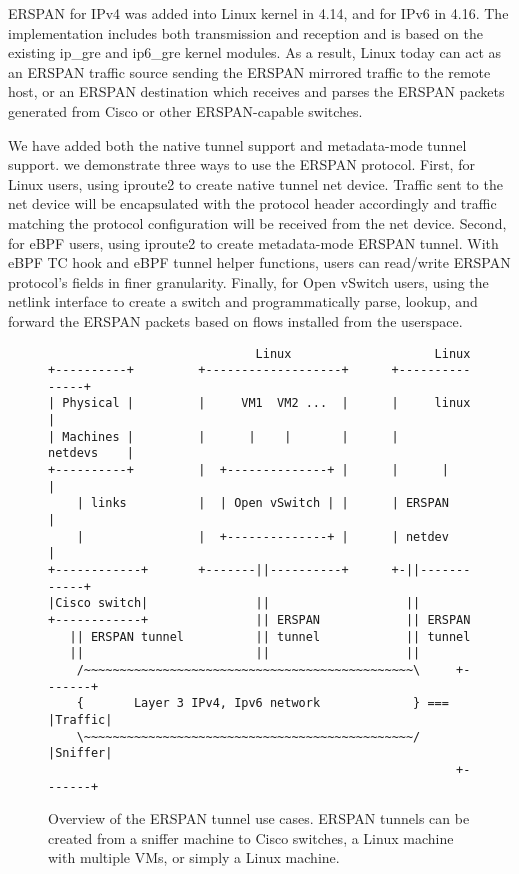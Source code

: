 \documentclass[10pt]{sigplanconf}
\begin{document}
ERSPAN for IPv4 was added into Linux kernel in 4.14, and for IPv6 in 4.16.
The implementation includes both transmission and reception and is based on the
existing ip\_gre and ip6\_gre kernel modules.  As a result, Linux today can act as
an ERSPAN traffic source sending the ERSPAN mirrored traffic to the remote host,
or an ERSPAN destination which receives and parses the ERSPAN packets generated
from Cisco or other ERSPAN-capable switches.
  
We have added both the native tunnel support and metadata-mode tunnel support.
we demonstrate three ways to use the ERSPAN protocol.
First, for Linux users, using iproute2 to create native tunnel net device.
Traffic sent to the net device will be encapsulated with the protocol header
accordingly and traffic matching the protocol configuration will be received
from the net device.  Second, for eBPF users, using iproute2 to create metadata-mode
ERSPAN tunnel.  With eBPF TC hook and eBPF tunnel helper functions, users can
read/write ERSPAN protocol’s fields in finer granularity.
Finally, for Open vSwitch users, using the netlink interface to create a switch
and programmatically parse, lookup, and forward the ERSPAN packets based on flows
installed from the userspace.

\begin{figure}
{\scriptsize
\begin{verbatim}
                             Linux                    Linux
+----------+         +-------------------+      +---------------+
| Physical |         |     VM1  VM2 ...  |      |     linux     |
| Machines |         |      |    |       |      |    netdevs    |
+----------+         |  +--------------+ |      |      |        |
    | links          |  | Open vSwitch | |      | ERSPAN        |
    |                |  +--------------+ |      | netdev        |
+------------+       +-------||----------+      +-||------------+ 
|Cisco switch|               ||                   ||
+------------+               || ERSPAN            || ERSPAN
   || ERSPAN tunnel          || tunnel            || tunnel
   ||                        ||                   ||
    /~~~~~~~~~~~~~~~~~~~~~~~~~~~~~~~~~~~~~~~~~~~~~~\     +-------+ 
    {       Layer 3 IPv4, Ipv6 network             } === |Traffic|
    \~~~~~~~~~~~~~~~~~~~~~~~~~~~~~~~~~~~~~~~~~~~~~~/     |Sniffer|
                                                         +-------+
\end{verbatim}   
}
\vspace{-0.5em}
\caption{Overview of the ERSPAN tunnel use cases. ERSPAN tunnels can be
created from a sniffer machine to Cisco switches, a Linux machine with
multiple VMs, or simply a Linux machine.}
\label{overview}
\vspace{-1.0em}
\end{figure}
\end{document}
